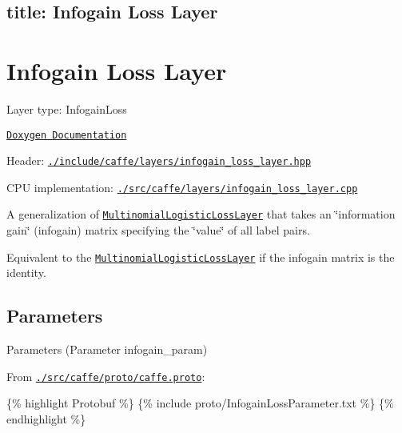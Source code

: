 

 \subsection*{title\+: Infogain Loss Layer }

\section*{Infogain Loss Layer}


\begin{DoxyItemize}
\item Layer type\+: {\ttfamily Infogain\+Loss}
\item \href{http://caffe.berkeleyvision.org/doxygen/classcaffe_1_1InfogainLossLayer.html}{\tt Doxygen Documentation}
\item Header\+: \href{https://github.com/BVLC/caffe/blob/master/include/caffe/layers/infogain_loss_layer.hpp}{\tt {\ttfamily ./include/caffe/layers/infogain\+\_\+loss\+\_\+layer.hpp}}
\item C\+PU implementation\+: \href{https://github.com/BVLC/caffe/blob/master/src/caffe/layers/infogain_loss_layer.cpp}{\tt {\ttfamily ./src/caffe/layers/infogain\+\_\+loss\+\_\+layer.cpp}}
\end{DoxyItemize}

A generalization of \href{multinomiallogisticloss.html}{\tt Multinomial\+Logistic\+Loss\+Layer} that takes an \char`\"{}information gain\char`\"{} (infogain) matrix specifying the \char`\"{}value\char`\"{} of all label pairs.

Equivalent to the \href{multinomiallogisticloss.html}{\tt Multinomial\+Logistic\+Loss\+Layer} if the infogain matrix is the identity.

\subsection*{Parameters}


\begin{DoxyItemize}
\item Parameters ({\ttfamily Parameter infogain\+\_\+param})
\item From \href{https://github.com/BVLC/caffe/blob/master/src/caffe/proto/caffe.proto}{\tt {\ttfamily ./src/caffe/proto/caffe.proto}}\+:
\end{DoxyItemize}

\{\% highlight Protobuf \%\} \{\% include proto/\+Infogain\+Loss\+Parameter.\+txt \%\} \{\% endhighlight \%\} 